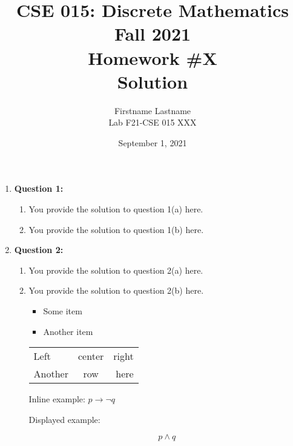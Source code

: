 \documentclass[11pt]{article}
\begin{document}
\author{Firstname Lastname\\
Lab F21-CSE 015 XXX}

\title{CSE 015: Discrete Mathematics\\
Fall 2021\\
Homework \#X\\
Solution}

\date{September 1, 2021}
\maketitle

\begin{enumerate}

\item
\textbf{Question 1:}

\begin{enumerate}[label=(\alph*)]
\item
You provide the solution to question 1(a) here.

\item
You provide the solution to question 1(b) here.

\end{enumerate}

\item
\textbf{Question 2:}

\begin{enumerate}[label=(\alph*)]
\item
You provide the solution to question 2(a) here.

\item
You provide the solution to question 2(b) here.

\begin{itemize}

\item Some item

\item Another item

\end{itemize}

\begin{tabular}{l c r}

Left & center & right \\
Another & row & here \\

\end{tabular}


Inline example: $p \rightarrow \lnot q$

Displayed example:

\begin{equation}
p \land q
\end{equation}


\end{enumerate}

\end{enumerate}
\end{document}
